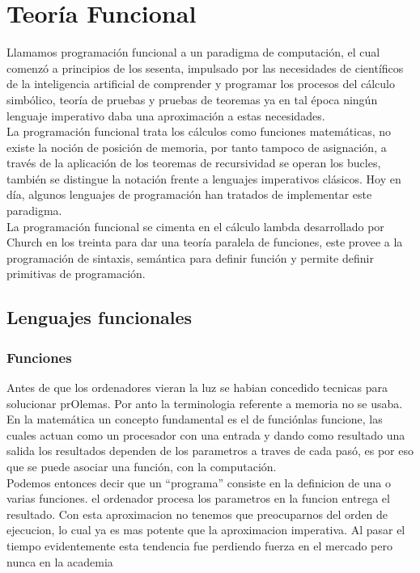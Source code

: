 
\chapter{Teoría Funcional}

Llamamos programación funcional a un paradigma de computación, el cual comenzó a principios de los sesenta, impulsado por las necesidades de científicos de la inteligencia artificial de comprender y programar los procesos del cálculo simbólico, teoría de pruebas y pruebas de teoremas ya en tal época ningún lenguaje imperativo daba una aproximación a estas necesidades.\\
La programación funcional trata los cálculos como funciones matemáticas, no existe la noción de posición de memoria, por tanto tampoco de asignación, a través de la aplicación de los teoremas de recursividad se operan los bucles, también se distingue la notación frente a lenguajes imperativos clásicos. Hoy en día, algunos lenguajes de programación han tratados de implementar este paradigma.\\
La programación funcional se cimenta en el cálculo lambda desarrollado por Church en los treinta para dar una teoría paralela de funciones, este provee a la programación de sintaxis, semántica para definir función y permite definir primitivas de programación.

\section{Lenguajes funcionales}

\subsection{Funciones}

Antes de que los ordenadores vieran la luz se habian concedido tecnicas para solucionar prOlemas. Por anto la terminologia referente a memoria no se usaba. En la matemática un concepto fundamental  es el de funciónlas funcione, las cuales actuan como un procesador con una entrada y dando como resultado una salida  los resultados dependen de los parametros a traves de cada pasó, es por eso que se puede asociar una función, con la computación.\\

Podemos entonces decir que un ``programa'' consiste en la definicion de una o varias funciones.  el ordenador procesa los parametros en la funcion  entrega el resultado. Con esta aproximacion no tenemos que preocuparnos del orden de ejecucion, lo cual ya es mas potente que la aproximacion imperativa.
Al pasar el tiempo evidentemente esta tendencia fue perdiendo fuerza en el mercado pero nunca en la academia 

